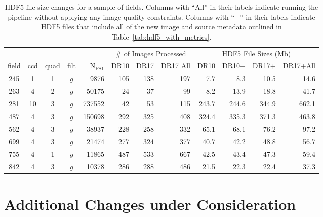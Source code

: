 \documentclass[12pt]{article}
\begin{document}
\begin{table}[ht!]
\centering
\scriptsize
\begin{tabular}{ c|c|c|c|r|r|r|r|r|r|r|r }
\multicolumn{5}{c}{} & \multicolumn{3}{|c|}{\# of Images Processed} & \multicolumn{4}{c}{HDF5 File Sizes (Mb)} \\
\cline{6-12}
 field & ccd & quad & filt & N$_{\mathrm{PS1}}$ & DR10 & DR17 & DR17 All & DR10  &  DR10+ &  DR17+ & DR17+All \\
 \hline
 245  &  1  &  1  &  $g$  &     9876  &  105     &  138  &  197  &    7.7  &   8.3  &  10.5  &   14.6  \\
 263  &  4  &  2  &  $g$  &    50175  &   24     &   37  &   99  &    8.2  &  13.9  &  18.8  &   41.7  \\
 281  & 10  &  3  &  $g$  &   737552  &   42     &   53  &  115  &  243.7  & 244.6  & 344.9  &  662.1  \\
 487  &  4  &  3  &  $g$  &   150698  &  292     &  325  &  408  &  324.4  & 335.3  & 371.3  &  463.8  \\
 562  &  4  &  3  &  $g$  &    38937  &  228     &  258  &  332  &   65.1  &  68.1  &  76.2  &   97.2  \\
 699  &  4  &  3  &  $g$  &    21474  &  277     &  324  &  377  &   40.7  &  42.2  &  48.8  &   56.7  \\
 755  &  4  &  1  &  $g$  &    11865  &  487     &  533  &  667  &   42.5  &  43.4  &  47.3  &   59.4  \\
 842  &  4  &  3  &  $g$  &    10378  &  286     &  288  &  486  &   21.5  &  22.3  &  22.4  &   37.3  \\
\end{tabular}
\caption{\small HDF5 file size changes for a sample of fields. Columns with ``All'' in their labels indicate running the pipeline without applying any image quality constraints. Columns with ``$+$'' in their labels indicate HDF5 files that include all of the new image and source metadata outlined in Table~\ref{tab:hdf5_with_metrics}.}
\label{tab:filesize}
\end{table}


\newpage 
\section{Additional Changes under Consideration}
\end{document}
